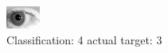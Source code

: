 \begin{figure}[h!]
\begin{center}
\includegraphics[width=0.60\columnwidth]{figures/ID204_class_4_target_3.png}
\end{center}
\caption{ Classification: 4 actual target: 3}
\label{fig:ID204_class_4_target_3}
\end{figure}
